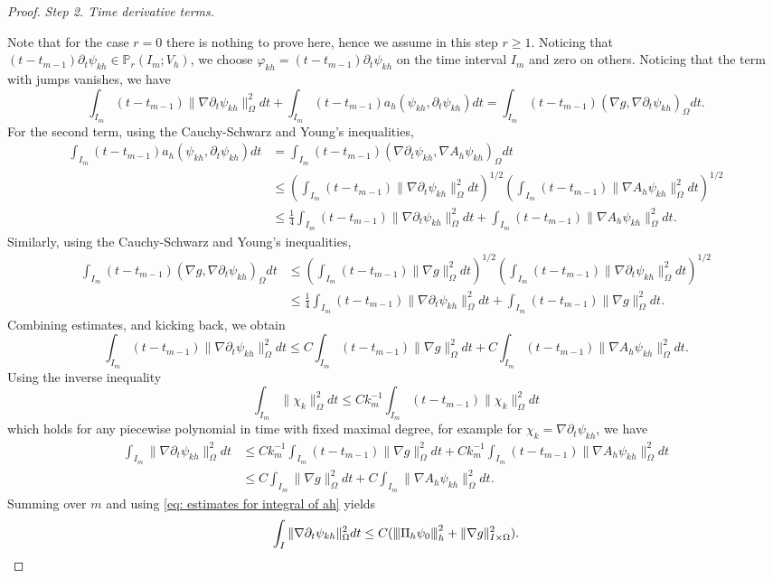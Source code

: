 \documentclass[10pt,a4paper]{amsart}
\newcommand{\Om}{\Omega}
\newcommand{\na}{\nabla}
\newcommand{\vertiii}[1]{{\left\vert\kern-0.25ex\left\vert\kern-0.25ex\left\vert #1
    \right\vert\kern-0.25ex\right\vert\kern-0.25ex\right\vert}}
\begin{document}
\begin{proof}
{\it Step 2. Time derivative terms.}

Note that for the case $r=0$ there is nothing to prove here, hence we assume in this step $r\ge 1$.
Noticing that $(t-t_{m-1})\partial_t \psi_{kh}\in \mathbb{P}_r(I_m;V_h)$, we  choose $\varphi_{kh}=(t-t_{m-1})\partial_t \psi_{kh}$ on the time interval $I_m$ and zero on others. Noticing that the term with jumps vanishes, we have
$$
\int_{I_m}(t-t_{m-1})\|\na \partial_t\psi_{kh}\|^2_\Omega dt+\int_{I_m}(t-t_{m-1})a_h(\psi_{kh},\partial_t \psi_{kh})dt =\int_{I_m}(t-t_{m-1})(\na g,\na \partial_t\psi_{kh})_\Omega dt.
$$
For the second term, using the Cauchy-Schwarz and Young's inequalities,
$$
\begin{aligned}
\int_{I_m}(t-t_{m-1})a_h(\psi_{kh},\partial_t \psi_{kh})dt&=\int_{I_m}(t-t_{m-1})( \na \partial_t\psi_{kh},\na A_h \psi_{kh})_\Omega dt\\
&\le \left(\int_{I_m}(t-t_{m-1})\| \na\partial_t \psi_{kh}\|_\Om^2dt\right)^{1/2}\left(\int_{I_m}(t-t_{m-1})\| \na A_h\psi_{kh}\|_\Om^2dt\right)^{1/2}\\
&\le \frac{1}{4}\int_{I_m}(t-t_{m-1})\| \na \partial_t \psi_{kh}\|_\Om^2dt+\int_{I_m}(t-t_{m-1})\| \na A_h\psi_{kh}\|_\Om^2dt.
\end{aligned}
$$
Similarly, 
using the Cauchy-Schwarz and Young's inequalities,
$$
\begin{aligned}
\int_{I_m}(t-t_{m-1})(\na g,\na\partial_t \psi_{kh})_\Omega dt&\le \left(\int_{I_m}(t-t_{m-1})\|\na g\|^2_\Omega dt\right)^{1/2}\left(\int_{I_m}(t-t_{m-1})\|\na \partial_t\psi_{kh}\|^2_\Omega dt\right)^{1/2}\\
&\le \frac{1}{4}\int_{I_m}(t-t_{m-1})\| \na\partial_t \psi_{kh}\|_\Om^2dt+\int_{I_m}(t-t_{m-1})\| \na g\|^2_\Om dt.
\end{aligned}
$$
Combining estimates, and kicking back, we obtain
$$
\int_{I_m}(t-t_{m-1})\|\na \partial_t\psi_{kh}\|^2_\Omega dt\le C\int_{I_m}(t-t_{m-1})\|\na g\|^2_\Omega dt+C\int_{I_m}(t-t_{m-1})\| \na A_h\psi_{kh}\|^2_\Om dt.
$$
Using the inverse inequality
$$
 \int_{I_m}\|\chi_{k}\|^2_\Omega dt\le Ck_{m}^{-1}\int_{I_m}(t-t_{m-1})\|\chi_{k}\|^2_\Omega dt
$$
which holds for any piecewise polynomial in time with fixed maximal degree,
for example for $\chi_k=\na\partial_t \psi_{kh}$, we have
$$
\begin{aligned}
\int_{I_m}\|\na \partial_t\psi_{kh}\|^2_\Omega dt&\le  Ck_{m}^{-1}\int_{I_m}(t-t_{m-1})\|\na g\|^2_\Omega dt+Ck_{m}^{-1}\int_{I_m}(t-t_{m-1})\| \na A_h\psi_{kh}\|_\Om^2dt\\
&\le  C\int_{I_m}\|\na g\|^2_\Omega dt+C\int_{I_m}\| \na A_h\psi_{kh}\|_\Om^2dt.
\end{aligned}
$$
Summing over $m$ and using \eqref{eq: estimates for integral of ah} yields
\begin{equation}\label{eq: estimates for integral of pa_tvkh}
  \int_{I}\|\na \partial_t\psi_{kh}\|^2_\Omega dt\le C(\vertiii{\Pi_h \psi_0}^2_h + \|\na g\|^2_{I\times \Om}).
\end{equation}


\end{proof}
\end{document}
